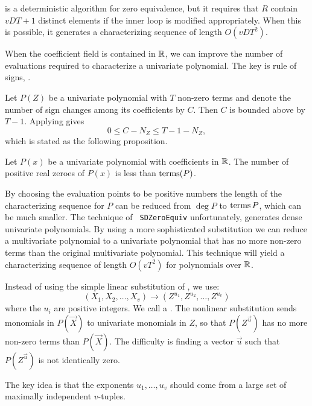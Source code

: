  is a deterministic algorithm for zero equivalence,
but it requires that $R$ contain $vDT+1$ distinct elements if the
inner loop is modified appropriately.  When this is possible, it
generates a characterizing sequence of length $O(vDT^2)$.

When the coefficient field is contained in $\mathbb{R}$, we can improve the
number of evaluations required to characterize a univariate
polynomial.  The key is {\Descartes} rule of signs, .

Let $P(Z)$ be a univariate polynomial with $T$ non-zero
terms and denote the number of sign changes among its coefficients by
$C$.  Then $C$ is bounded above by $T-1$.  Applying
 gives 
\[
0 \le C - N_Z \le T - 1 - N_Z,
\]
which is stated as the following proposition.

\begin{proposition}
\label{Positive:Zeroes:Prop}
Let $P(x)$ be a univariate polynomial with coefficients in $\mathbb{R}$.  The
number of positive real zeroes of $P(x)$ is less than $\operatorname{terms}(P)$.
\end{proposition}

By choosing the evaluation points to be positive numbers the length of
the characterizing sequence for $P$ can be reduced from $\deg P$ to
$\operatorname{terms} P$, which can be much smaller.  The technique of {\tt
SDZeroEquiv} unfortunately, generates dense univariate polynomials.
By using a more sophisticated substitution we can reduce a
multivariate polynomial to a univariate polynomial that has no more
non-zero terms than the original multivariate polynomial.  This
technique will yield a characterizing sequence of length $O(vT^2)$ for
polynomials over $\mathbb{R}$.

\medskip
Instead of using the simple linear substitution of
, we use:
\begin{equation} \label{Zero:MultiSub:Eq}
(X_1, X_2, \ldots, X_v) \longrightarrow
  (Z^{u_1}, Z^{u_2}, \ldots, Z^{u_v})
\end{equation}
where the $u_i$ are positive integers.  We call
 a .  The
nonlinear substitution sends monomials in $P(\vec{X})$ to univariate
monomials in $Z$, so that $P(Z^{\vec{u}})$ has no more non-zero terms
than $P(\vec{X})$.  The difficulty is finding a vector $\vec{u}$ such
that $P(Z^{\vec{u}})$ is not identically zero.

The key idea is that the exponents $u_1, \ldots, u_v$ should come from a
large set of maximally independent $v$-tuples.

